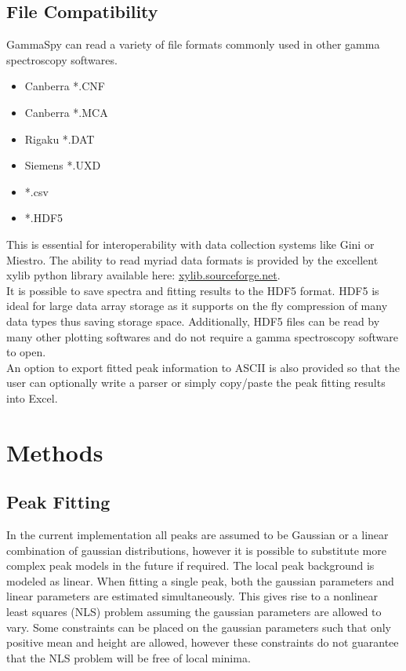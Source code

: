 \documentclass[10pt]{article}
\begin{document}
\subsection{File Compatibility}
GammaSpy can read a variety of file formats commonly used in other gamma spectroscopy softwares.
\begin{itemize}
    \item Canberra *.CNF
    \item Canberra *.MCA
    \item Rigaku *.DAT
    \item Siemens *.UXD
    \item *.csv
    \item *.HDF5
\end{itemize}
This is essential for interoperability with data collection systems like Gini or Miestro.  The ability to read
myriad data formats is provided by the excellent xylib python library available here: \url{xylib.sourceforge.net}. \\

It is possible to save spectra and fitting results to the HDF5 format.  HDF5 is ideal for large data array storage as
it supports on the fly compression of many data types thus saving storage space.  Additionally, HDF5 files can
be read by many other plotting softwares and do not require a gamma spectroscopy software to open. \\

An option to export fitted peak information to ASCII is also provided so that the user can optionally write a parser
or simply copy/paste the peak fitting results into Excel. \\

\section{Methods}

\subsection{Peak Fitting}

In the current implementation all peaks are assumed to be Gaussian or a linear combination of gaussian distributions, however it is possible to
substitute more complex peak models in the future if required.
The local peak background is modeled as linear.  When fitting a single peak, both the gaussian parameters and linear parameters are
estimated simultaneously.  This gives rise to a nonlinear least squares (NLS) problem assuming the gaussian parameters are allowed to vary.
Some constraints can be placed on the gaussian parameters such that only positive mean and height are
allowed, however these constraints do not guarantee that the NLS problem will be free of local minima.
\end{document}
